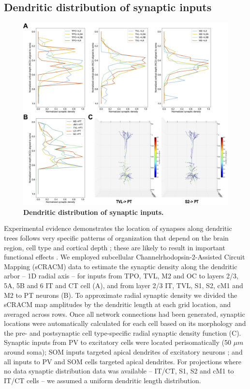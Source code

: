 \subsection{Dendritic distribution of synaptic inputs}

\begin{figure}[!h]  %
\centering
\includegraphics[width=\textwidth]{figs/conn_dend.png}
\caption{{\bf Dendritic distribution of synaptic inputs.}
}
\label{fig_conn_dend}
\end{figure}

Experimental evidence demonstrates the location of synapses along dendritic trees follows very specific patterns of organization that depend on the brain region, cell type and cortical depth \cite{Petr09,Sute15}; these are likely to result in important functional effects \cite{Kubo15,Laud14,Spru08}. We employed subcellular Channelrhodopsin-2-Assisted Circuit Mapping (sCRACM) data to estimate the synaptic density along the dendritic arbor -- 1D radial axis -- for inputs from TPO, TVL, M2 and OC to layers 2/3, 5A, 5B and 6 IT and CT cell \cite{Hook13} (A), and from layer 2/3 IT, TVL, S1, S2, cM1 and M2 to PT neurons \cite{Sute15} (B). To approximate radial synaptic density we divided the sCRACM map amplitudes by the dendritic length at each grid location, and averaged across rows. Once all network connections had been generated, synaptic locations were automatically calculated for each cell based on its morphology and the pre- and postsynaptic cell type-specific radial synaptic density function (C). Synaptic inputs from PV to excitatory cells were located perisomatically (50 $\mu m$ around soma); SOM inputs targeted apical dendrites of excitatory neurons \cite{Naka16,Katz11}; and all inputs to PV and SOM cells targeted apical dendrites. For projections where no data synaptic distribution data was available -- IT/CT, S1, S2 and cM1 to IT/CT cells -- we assumed a uniform dendritic length distribution. 

